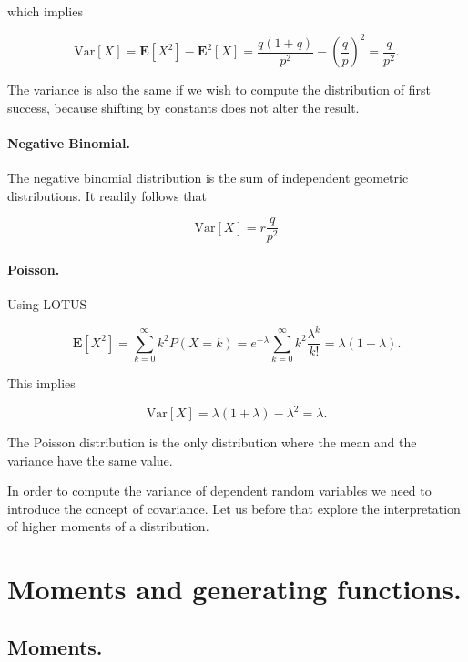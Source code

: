 \documentclass[12pt]{article}
\begin{document}
\noindent
which implies

\begin{equation}
\mbox{Var} [ X ] = \mathbf{E} [ X^{2} ] - \mathbf{E}^{2} [ X ] =
\frac{q (1 + q)}{p^{2}} - \left( \frac{q}{p} \right)^{2} = \frac{q}{p^{2}}.
\end{equation}

\noindent
The variance is also the same if we wish to compute the distribution of
first success, because shifting by constants does not alter the result.

\paragraph{Negative Binomial.}
The negative binomial distribution is the sum of independent
geometric distributions. 
It readily follows that

\begin{equation}
\mbox{Var} [ X ] = r \frac{q}{p^{2}}
\end{equation}

\paragraph{Poisson.}
Using LOTUS

\begin{equation}
\mathbf{E}[X^{2}] = \sum_{k = 0}^{\infty} k^{2} P ( X = k ) = 
e^{-\lambda} \sum_{k = 0}^{\infty} k^{2} \frac{\lambda^{k}}{k!} = \lambda ( 1 + \lambda ).
\end{equation}

\noindent
This implies

\begin{equation}
\mbox{Var} [ X ] = \lambda ( 1 + \lambda) - \lambda^{2} = \lambda.
\end{equation}

\noindent
The Poisson distribution is the only distribution where the mean and the variance
have the same value.

In order to compute the variance of dependent random variables we need to introduce the 
concept of covariance.
Let us before that explore the interpretation of higher moments of a distribution.

\section{Moments and generating functions.}

\subsection{Moments.}
\end{document}
